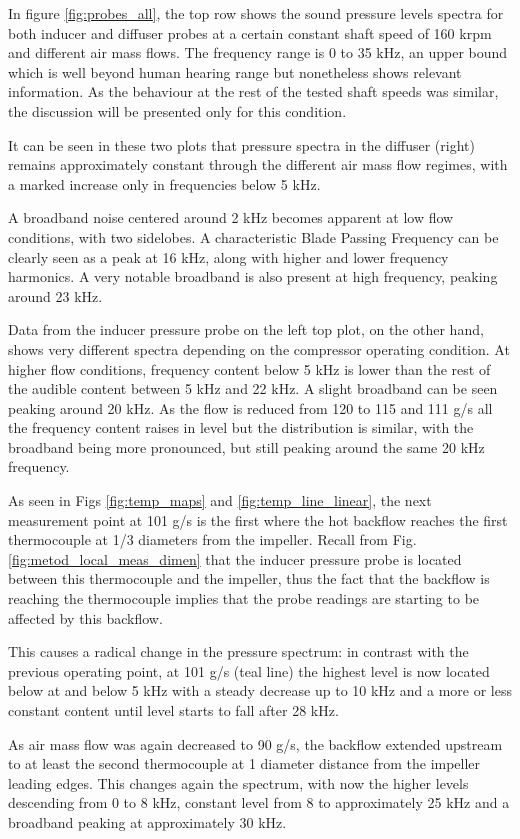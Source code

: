 In figure \ref{fig:probes_all}, the top row shows the sound pressure levels spectra for both inducer and diffuser probes at a certain constant shaft speed of 160 krpm and different air mass flows. The frequency range is 0 to 35 kHz, an upper bound which is well beyond human hearing range but nonetheless shows relevant information. As the behaviour at the rest of the tested shaft speeds was similar, the discussion will be presented only for this condition.

It can be seen in these two plots that pressure spectra in the diffuser (right) remains approximately constant through the different air mass flow regimes, with a marked increase only in frequencies below 5 kHz.

A broadband noise centered around 2 kHz becomes apparent at low flow conditions, with two sidelobes. A characteristic Blade Passing Frequency can be clearly seen as a peak at 16 kHz, along with higher and lower frequency harmonics. A very notable broadband is also present at high frequency, peaking around 23 kHz.

Data from the inducer pressure probe on the left top plot, on the other hand, shows very different spectra depending on the compressor operating condition. At higher flow conditions, frequency content below 5 kHz is lower than the rest of the audible content between 5 kHz and 22 kHz. A slight broadband can be seen peaking around 20 kHz. As the flow is reduced from 120 to 115 and 111 g/s all the frequency content raises in level but the distribution is similar, with the broadband being more pronounced, but still peaking around the same 20 kHz frequency.

As seen in Figs \ref{fig:temp_maps} and \ref{fig:temp_line_linear}, the next measurement point at 101 g/s is the first where the hot backflow reaches the first thermocouple at 1/3 diameters from the impeller. Recall from Fig. \ref{fig:metod_local_meas_dimen} that the inducer pressure probe is located between this thermocouple and the impeller, thus the fact that the backflow is reaching the thermocouple implies that the probe readings are starting to be affected by this backflow.

This causes a radical change in the pressure spectrum: in contrast with the previous operating point, at 101 g/s (teal line) the highest level is now located below at and below 5 kHz with a steady decrease up to 10 kHz and a more or less constant content until level starts to fall after 28 kHz.

As air mass flow was again decreased to 90 g/s, the backflow extended upstream to at least the second thermocouple at 1 diameter distance from the impeller leading edges. This changes again the spectrum, with now the higher levels descending from 0 to 8 kHz, constant level from 8 to approximately 25 kHz and a broadband peaking at approximately 30 kHz.

